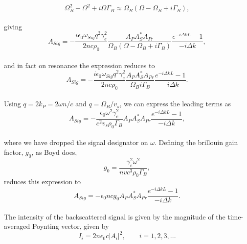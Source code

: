 \documentclass[%
  reprint,
  superscriptaddress,
  amsmath,amssymb,
  aps,
  prapplied,
]{revtex4-2}
\begin{document}
\\
\begin{equation}
\Omega_{B}^{2} - \Omega^{2} + i\Omega\Gamma_{B} \approx \Omega_{B}(\Omega - \Omega_{B} + i\Gamma_{B}),
\end{equation}
\\
giving
\\
\begin{equation}
  A_{Sig} = -\frac{i\epsilon_{0}\omega_{Sig}q^{2}\gamma_{e}^{2}}{2nc\rho_{0}}\frac{A_{P}A_{S}^{*}A_{Pr}}{\Omega_{B}(\Omega - \Omega_{B} + i\Gamma_{B})} \frac{e^{-i\Delta kL} - 1}{-i\Delta k},
  \label{eq:resonance}
\end{equation}
\\
and in fact on resonance the expression reduces to
\\
\begin{equation}
  A_{Sig} = -\frac{i\epsilon_{0}\omega_{Sig}q^{2}\gamma_{e}^{2}}{2nc\rho_{0}}\frac{A_{P}A_{S}^{*}A_{Pr}}{\Omega_{B}i\Gamma_{B}} \frac{e^{-i\Delta kL} - 1}{-i\Delta k}.
\end{equation}
\\
Using $q = 2k_{P} = 2\omega n/c$ and $q = \Omega_{B}/v_{s}$, we can express the leading terms as
\\
\begin{equation}
  A_{Sig} = -\frac{\epsilon_{0}\omega^{2}\gamma_{e}^{2}}{c^{2}v_{s}\rho_{0}\Gamma_{B}}A_{P}A_{S}^{*}A_{Pr} \frac{e^{-i\Delta kL} - 1}{-i\Delta k},
\end{equation}
\\
where we have dropped the signal designator on $\omega$. Defining the brillouin gain factor, $g_{0}$, as Boyd does,
\\
\begin{equation}
  g_{0} = \frac{\gamma_{e}^{2}\omega^{2}}{nvc^{3}\rho_{0}\Gamma_{B}},
\end{equation}
reduces this expression to
\\
\begin{equation}
  A_{Sig} = -\epsilon_{0}ncg_{0}A_{P}A_{S}^{*}A_{Pr} \frac{e^{-i\Delta kL} - 1}{-i\Delta k}.
\end{equation}
\\
The intensity of the backscattered signal is given by the magnitude of the time-averaged Poynting vector, given by
\\
\begin{equation}
  I_{i} = 2n\epsilon_{0}c|A_{i}|^{2}, \qquad i = 1,2,3,...
\end{equation}
\\
\end{document}
